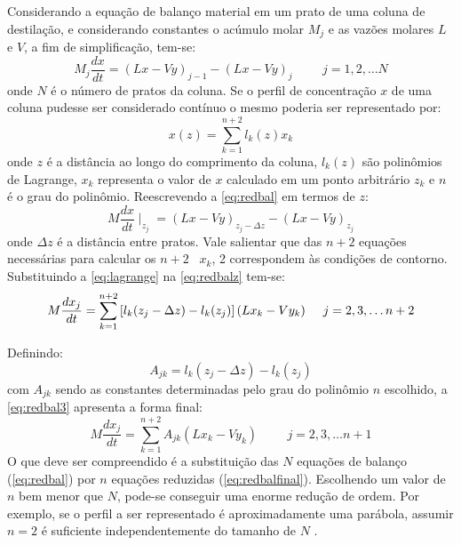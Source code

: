 \begin{enumerate}
Considerando a equação de balanço material em um prato de uma coluna de destilação, e considerando constantes
o acúmulo molar $M_j$ e as vazões molares $L$ e $V$, a fim de simplificação, tem-se:
\begin{equation}
M_j \dfrac{dx}{dt}=(Lx-Vy)_{j-1} - (Lx-Vy)_j \hspace{1cm} j=1,2,\ldots N
\label{eq:redbal}
\end{equation}
onde $N$ é o número de pratos da coluna. Se o perfil de concentração $x$ de uma coluna pudesse ser considerado contínuo
o mesmo poderia ser representado por:
\begin{equation}
x(z)=\sum^{n+2}_{k=1}l_k(z)x_k
\label{eq:lagrange}
\end{equation}
onde $z$ é a distância ao longo do comprimento da coluna, $l_k(z)$ são polinômios de Lagrange, $x_k$ representa o
valor de $x$ calculado em um ponto arbitrário $z_k$ e $n$ é o grau do polinômio. Reescrevendo a \autoref{eq:redbal} em termos de $z$:
\begin{equation}
M  \dfrac{dx}{dt} \mid_{z_j}=(Lx-Vy)_{z_j-\Delta z} - (Lx-Vy)_{z_j}
\label{eq:redbalz}
\end{equation}
onde $\Delta z$ é a distância entre pratos. Vale salientar que das $n+2$ equações necessárias para calcular os
$n+2$ \ $x_k$, 2 correspondem às condições de
contorno. Substituindo a \autoref{eq:lagrange} na \autoref{eq:redbalz} tem-se:
\begin{equation}
M\dfrac{dx_j}{dt}=\sum^{n+2}_{k=1} \left[ l_k(z_j-\Delta z) - l_k(z_j)\right](Lx_k-Vy_k)  \hspace{0.5cm} j=2,3,\ldots n+2
\label{eq:redbal3}
\end{equation}

Definindo:
\begin{equation}
A_{jk} = l_k(z_j-\Delta z) - l_k(z_j)
\end{equation}
com $A_{jk}$ sendo as constantes determinadas pelo grau do polinômio $n$ escolhido, a \autoref{eq:redbal3} apresenta a
forma final:
\begin{equation}
M\dfrac{dx_j}{dt}=\sum^{n+2}_{k=1} A_{jk}(Lx_k-Vy_k)  \hspace{1cm} j=2,3,\ldots n+1
\label{eq:redbalfinal}
\end{equation}
O que deve ser compreendido é a substituição das $N$ equações de balanço (\autoref{eq:redbal}) por $n$ equações
reduzidas (\autoref{eq:redbalfinal}). Escolhendo um valor de $n$ bem menor que $N$, pode-se conseguir uma enorme redução
de ordem. Por exemplo, se o perfil a ser representado é aproximadamente uma parábola, assumir $n=2$ é suficiente
independentemente do tamanho de $N$ \cite{Cho:1984}.


\end{enumerate}
